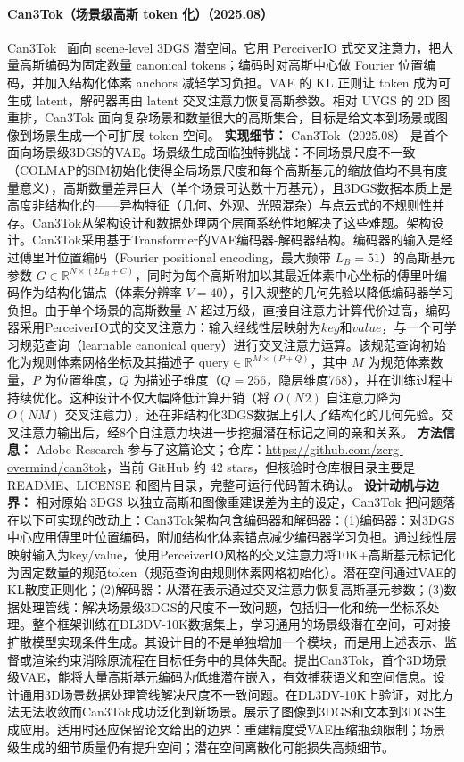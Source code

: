 \paragraph{Can3Tok（场景级高斯 token 化）（2025.08）}
Can3Tok~\cite{2508_01464} 面向 scene-level 3DGS 潜空间。它用 PerceiverIO 式交叉注意力，把大量高斯编码为固定数量 canonical tokens；编码时对高斯中心做 Fourier 位置编码，并加入结构化体素 anchors 减轻学习负担。VAE 的 KL 正则让 token 成为可生成 latent，解码器再由 latent 交叉注意力恢复高斯参数。相对 UVGS 的 2D 图重排，Can3Tok 面向复杂场景和数量很大的高斯集合，目标是给文本到场景或图像到场景生成一个可扩展 token 空间。
\textbf{实现细节：} Can3Tok（2025.08） 是首个面向场景级3DGS的VAE。场景级生成面临独特挑战：不同场景尺度不一致（COLMAP的SfM初始化使得全局场景尺度和每个高斯基元的缩放值均不具有度量意义），高斯数量差异巨大（单个场景可达数十万基元），且3DGS数据本质上是高度非结构化的——异构特征（几何、外观、光照混杂）与点云式的不规则性并存。Can3Tok从架构设计和数据处理两个层面系统性地解决了这些难题。架构设计。Can3Tok采用基于Transformer的VAE编码器-解码器结构。编码器的输入是经过傅里叶位置编码（Fourier positional encoding，最大频带 $L_B=51$）的高斯基元参数 $G \in \mathbb{R}^{N \times (2L_B+C)}$，同时为每个高斯附加以其最近体素中心坐标的傅里叶编码作为结构化锚点（体素分辨率 $V=40$），引入规整的几何先验以降低编码器学习负担。由于单个场景的高斯数量 $N$ 超过万级，直接自注意力计算代价过高，编码器采用PerceiverIO式的交叉注意力：输入经线性层映射为$key$和$value$，与一个可学习规范查询（learnable canonical query）进行交叉注意力运算。该规范查询初始化为规则体素网格坐标及其描述子 $\mathrm{query} \in \mathbb{R}^{M \times (P+Q)}$，其中 $M$ 为规范体素数量，$P$ 为位置维度，$Q$ 为描述子维度（$Q=256$，隐层维度768），并在训练过程中持续优化。这种设计不仅大幅降低计算开销（将 $O(N^{}2)$ 自注意力降为 $O(NM)$ 交叉注意力），还在非结构化3DGS数据上引入了结构化的几何先验。交叉注意力输出后，经8个自注意力块进一步挖掘潜在标记之间的亲和关系。
\textbf{方法信息：} Adobe Research 参与了这篇论文；仓库：\url{https://github.com/zerg-overmind/can3tok}，当前 GitHub 约 42 stars，但核验时仓库根目录主要是 README、LICENSE 和图片目录，完整可运行代码暂未确认。
\textbf{设计动机与边界：} 相对原始 3DGS 以独立高斯和图像重建误差为主的设定，Can3Tok 把问题落在以下可实现的改动上：Can3Tok架构包含编码器和解码器：(1)编码器：对3DGS中心应用傅里叶位置编码，附加结构化体素锚点减少编码器学习负担。通过线性层映射输入为key/value，使用PerceiverIO风格的交叉注意力将10K+高斯基元标记化为固定数量的规范token（规范查询由规则体素网格初始化）。潜在空间通过VAE的KL散度正则化；(2)解码器：从潜在表示通过交叉注意力恢复高斯基元参数；(3)数据处理管线：解决场景级3DGS的尺度不一致问题，包括归一化和统一坐标系处理。整个框架训练在DL3DV-10K数据集上，学习通用的场景级潜在空间，可对接扩散模型实现条件生成。其设计目的不是单独增加一个模块，而是用上述表示、监督或渲染约束消除原流程在目标任务中的具体失配。提出Can3Tok，首个3D场景级VAE，能将大量高斯基元编码为低维潜在嵌入，有效捕获语义和空间信息。设计通用3D场景数据处理管线解决尺度不一致问题。在DL3DV-10K上验证，对比方法无法收敛而Can3Tok成功泛化到新场景。展示了图像到3DGS和文本到3DGS生成应用。适用时还应保留论文给出的边界：重建精度受VAE压缩瓶颈限制；场景级生成的细节质量仍有提升空间；潜在空间离散化可能损失高频细节。
